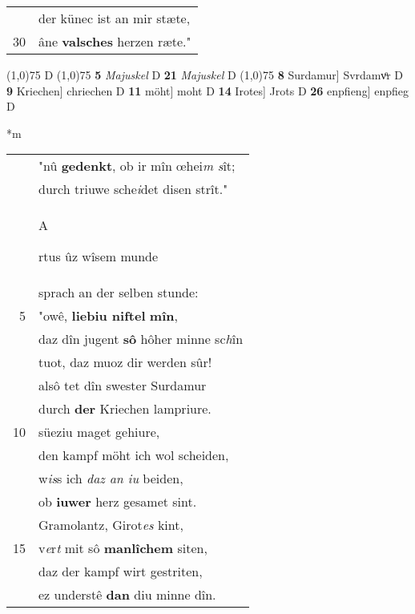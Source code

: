 \documentclass[8pt,a4paper,notitlepage]{article}
\begin{document}
\begin{table}[ht]
\begin{minipage}[t]{0.5\linewidth}
\begin{tabular}{rl}
 & der künec ist an mir stæte,\\ 
30 & âne \textbf{valsches} herzen ræte."\\ 
\end{tabular}
\scriptsize
\line(1,0){75} \newline
D \newline
\line(1,0){75} \newline
\textbf{5} \textit{Majuskel} D  \textbf{21} \textit{Majuskel} D  \newline
\line(1,0){75} \newline
\textbf{8} Surdamur] Svrdamvͦr D \textbf{9} Kriechen] chriechen D \textbf{11} möht] moht D \textbf{14} Irotes] Jrots D \textbf{26} enpfieng] enpfieg D \newline
\end{minipage}
\hspace{0.5cm}
\begin{minipage}[t]{0.5\linewidth}
\small
\begin{center}*m
\end{center}
\begin{tabular}{rl}
 & "nû \textbf{gedenkt}, ob ir mîn œhei\textit{m s}ît;\\ 
 & durch triuwe sche\textit{i}det disen strît."\\ 
 & \begin{large}A\end{large}rtus ûz wîsem munde\\ 
 & sprach an der selben stunde:\\ 
5 & "owê, \textbf{liebiu niftel} \textbf{mîn},\\ 
 & daz dîn jugent \textbf{sô} hôher minne sc\textit{h}în\\ 
 & tuot, daz muoz dir werden sûr!\\ 
 & alsô tet dîn swester Surdamur\\ 
 & durch \textbf{der} Kriechen lampriure.\\ 
10 & süeziu maget gehiure,\\ 
 & den kampf möht ich wol scheiden,\\ 
 & w\textit{is}s ich \textit{daz an iu} beiden,\\ 
 & ob \textbf{iuwer} herz gesamet sint.\\ 
 & Gramolantz, Girot\textit{es} kint,\\ 
15 & v\textit{e}r\textit{t} mit sô \textbf{manlîchem} siten,\\ 
 & daz der kampf wirt gestriten,\\ 
 & ez understê \textbf{dan} diu minne dîn.\\ 

\end{tabular}
\end{minipage}
\end{table}
\end{document}
